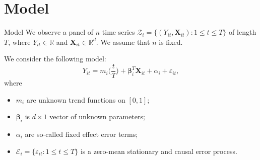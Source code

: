 \documentclass[10pt, handout]{beamer}
\newcommand{\Eps}{\mathcal{E}}
\newcommand{\eps}{\varepsilon}
\newcommand{\reals}{\mathbb{R}}
\newcommand{\X}{\boldsymbol{X}}
\newcommand{\bfbeta}{\boldsymbol{\beta}}
\begin{document}


\section{Model}

\begin{frame}{Model}
We observe a panel of $n$ time series $\mathcal{Z}_i = \{(Y_{it}, \X_{it}): 1 \le t \le T \}$ of length $T$, where $Y_{it} \in \reals$ and $\X_{it}\in \reals^{d}$. \pause We assume that $n$ is fixed. \pause

We consider the following model:
\begin{equation*}
Y_{it} = m_i \Big( \frac{t}{T} \Big) + \bfbeta_i^T\X_{it}+ \alpha_i + \varepsilon_{it},
\end{equation*}\pause
\vspace{-3mm}
where
\begin{itemize}
\item $m_i$ are unknown trend functions on $[0,1]$;\pause
\item $\bfbeta_i$ is $d\times 1$ vector of unknown parameters;\pause
\item $\alpha_i$ are so-called fixed effect error terms;\pause
\item $\Eps_i = \{\eps_{it}: 1\leq t \leq T\}$ is a zero-mean stationary and causal error process.
\end{itemize}
\end{frame}
\end{document}
